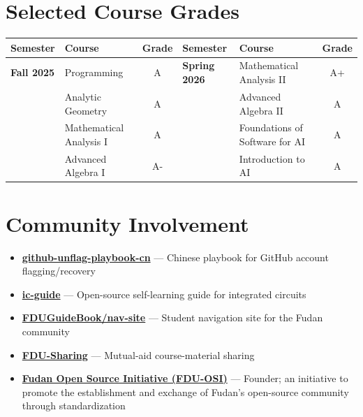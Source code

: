 \documentclass[10pt,letterpaper]{article}
\begin{document}
\section*{Selected Course Grades}
\begin{tabular*}{\textwidth}{@{\extracolsep{\fill}}llcllc@{}}
\textbf{Semester} & \textbf{Course} & \textbf{Grade} & \textbf{Semester} & \textbf{Course} & \textbf{Grade} \\ \hline
\textbf{Fall 2025} & Programming & A & \textbf{Spring 2026} & Mathematical Analysis II & A+ \\
 & Analytic Geometry & A & & Advanced Algebra II & A \\
 & Mathematical Analysis I & A & & Foundations of Software for AI & A \\
 & Advanced Algebra I & A- & & Introduction to AI & A \\
\end{tabular*}

\section*{Community Involvement}
\begin{itemize}
  \item \textbf{\href{https://chi-shan0707.github.io/github-unflag-playbook-cn}{github-unflag-playbook-cn}} --- Chinese playbook for GitHub account flagging/recovery
  \item \textbf{\href{https://crys-chen.github.io/ic-guide/}{ic-guide}} --- Open-source self-learning guide for integrated circuits
  \item \textbf{\href{https://fduguidebook.com/}{FDUGuideBook/nav-site}} --- Student navigation site for the Fudan community
  \item \textbf{\href{https://fdu-sharing.vercel.app/}{FDU-Sharing}} --- Mutual-aid course-material sharing
  \item \textbf{\href{https://github.com/Chi-Shan0707/fdu-opensource-initiative}{Fudan Open Source Initiative (FDU-OSI)}} --- Founder; an initiative to promote the establishment and exchange of Fudan's open-source community through standardization
\end{itemize}
\end{document}
